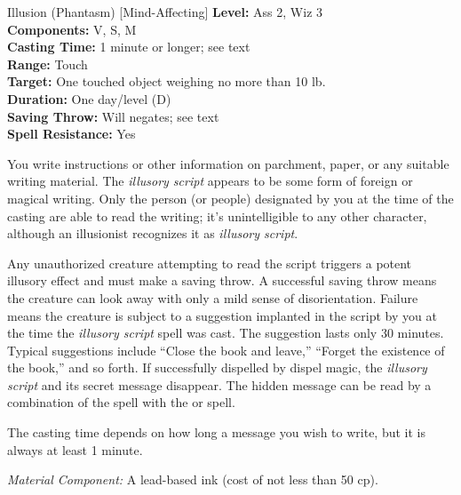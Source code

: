 {Illusion (Phantasm) [Mind-Affecting]}
{
	\textbf{Level:}
	Ass 2, Wiz 3\\
	\textbf{Components:}
	V, S, M\\
	\textbf{Casting Time:}
	1 minute or longer; see text\\
	\textbf{Range:}
	Touch\\
	\textbf{Target:}
	One touched object weighing no more than 10 lb.\\
	\textbf{Duration:}
	One day/level (D)\\
	\textbf{Saving Throw:}
	Will negates; see text\\
	\textbf{Spell Resistance:}
	Yes\\
}
{
	You write instructions or other information on parchment, paper, or any suitable writing material. The \emph{illusory script} appears to be some form of foreign or magical writing. Only the person (or people) designated by you at the time of the casting are able to read the writing; it's unintelligible to any other character, although an illusionist recognizes it as \emph{illusory script}.

	Any unauthorized creature attempting to read the script triggers a potent illusory effect and must make a saving throw. A successful saving throw means the creature can look away with only a mild sense of disorientation. Failure means the creature is subject to a suggestion implanted in the script by you at the time the \emph{illusory script} spell was cast. The suggestion lasts only 30 minutes. Typical suggestions include ``Close the book and leave,'' ``Forget the existence of the book,'' and so forth. If successfully dispelled by dispel magic, the \emph{illusory script} and its secret message disappear. The hidden message can be read by a combination of the  spell with the  or  spell.

	The casting time depends on how long a message you wish to write, but it is always at least 1 minute.

	\textit{Material Component:}
	A lead-based ink (cost of not less than 50 cp).

}
